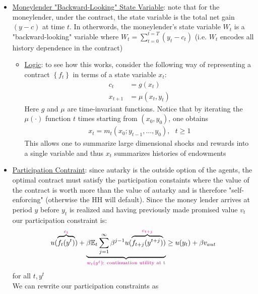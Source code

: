 \documentclass{article}
\begin{document}
\begin{itemize}
    \item \underline{Moneylender "Backward-Looking" State Variable}: note that for the moneylender, under the contract, the state variable is the total net gain $(y- c)$ at time $t$. In otherwords, the moneylender's state variable $W_{t}$ is a "backward-looking" variable where $W_{t} = \sum_{t=0}^{t=T} (y_{t} - c_{t})$ (i.e. $W_{t}$ encodes all history dependence in the contract)
    \begin{itemize}
        \item \underline{Logic}: to see how this works, consider the following way of representing a contract $\left\{ f_{t} \right\}$ in terms of a state variable $x_{t}$:
        \begin{align*}
            c_{t} &= g(x_{t}) \\
            x_{t+1} &= \mu (x_{t}, y_{t})
        \end{align*}
        Here $g$ and $\mu$ are time-invariant functions. Notice that by iterating the $\mu(\cdot)$ function $t$ times starting from $(x_{0}, y_{0})$, one obtains
        \begin{gather*}
            x_{t} = m_{t}(x_{0}; y_{t-1}, \dots, y_{0}), \ \ \ t \geq 1
        \end{gather*}
        This allows one to summarize large dimensional shocks and rewards into a single variable and thus $x_{t}$ summarizes histories of endowments
    \end{itemize}
    \item \underline{Participation Contraint}: since autarky is the outside option of the agents, the optimal contract must satisfy the participation constaints where the value of the contract is worth more than the value of autarky and is therefore "self-enforcing" (otherwise the HH will default). Since the money lender arrives at period $y$ before $y_{t}$ is realized and having previously made promised value $v_{t}$ our participation constraint is:
    \begin{gather*}
        u(\overbrace{f_{t}(y^{t})}^{\begingroup\color{magenta} c_{t} \endgroup}) + \underbrace{\beta \mathbb{E}_{t} \sum_{j=1}^{\infty} \beta^{j-1} u(\overbrace{f_{t+j}(y^{t+j})}^{\begingroup\color{magenta} c_{t+j} \endgroup})}_{\begingroup\color{magenta} w_{t}(y^{t}): \ \text{continuation utility at t} \endgroup} \geq u(y_{t}) + \beta v_{aut}
    \end{gather*}
    for all $t, y^{t}$ \\
    We can rewrite our participation constraints as
    \begin{gather*}

\end{gather*}
\end{itemize}
\end{document}
